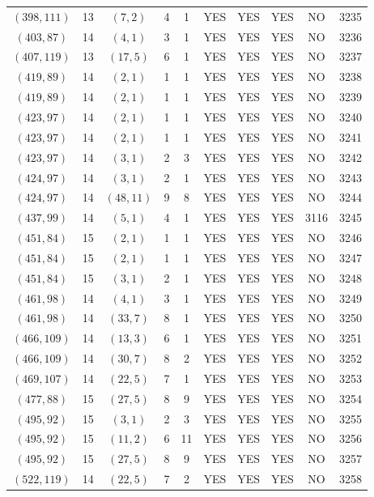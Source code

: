 \begin{longtable}{|c|c|c|c|c|c|c|c|c|c|}
$(398, 111)$ & 13 & $(7, 2)$ & 4 & 1 & YES & YES & YES & NO & 3235\\
$(403, 87)$ & 14 & $(4, 1)$ & 3 & 1 & YES & YES & YES & NO & 3236\\
$(407, 119)$ & 13 & $(17, 5)$ & 6 & 1 & YES & YES & YES & NO & 3237\\
$(419, 89)$ & 14 & $(2, 1)$ & 1 & 1 & YES & YES & YES & NO & 3238\\
$(419, 89)$ & 14 & $(2, 1)$ & 1 & 1 & YES & YES & YES & NO & 3239\\
$(423, 97)$ & 14 & $(2, 1)$ & 1 & 1 & YES & YES & YES & NO & 3240\\
$(423, 97)$ & 14 & $(2, 1)$ & 1 & 1 & YES & YES & YES & NO & 3241\\
$(423, 97)$ & 14 & $(3, 1)$ & 2 & 3 & YES & YES & YES & NO & 3242\\
$(424, 97)$ & 14 & $(3, 1)$ & 2 & 1 & YES & YES & YES & NO & 3243\\
$(424, 97)$ & 14 & $(48, 11)$ & 9 & 8 & YES & YES & YES & NO & 3244\\
$(437, 99)$ & 14 & $(5, 1)$ & 4 & 1 & YES & YES & YES & 3116 & 3245\\
$(451, 84)$ & 15 & $(2, 1)$ & 1 & 1 & YES & YES & YES & NO & 3246\\
$(451, 84)$ & 15 & $(2, 1)$ & 1 & 1 & YES & YES & YES & NO & 3247\\
$(451, 84)$ & 15 & $(3, 1)$ & 2 & 1 & YES & YES & YES & NO & 3248\\
$(461, 98)$ & 14 & $(4, 1)$ & 3 & 1 & YES & YES & YES & NO & 3249\\
$(461, 98)$ & 14 & $(33, 7)$ & 8 & 1 & YES & YES & YES & NO & 3250\\
$(466, 109)$ & 14 & $(13, 3)$ & 6 & 1 & YES & YES & YES & NO & 3251\\
$(466, 109)$ & 14 & $(30, 7)$ & 8 & 2 & YES & YES & YES & NO & 3252\\
$(469, 107)$ & 14 & $(22, 5)$ & 7 & 1 & YES & YES & YES & NO & 3253\\
$(477, 88)$ & 15 & $(27, 5)$ & 8 & 9 & YES & YES & YES & NO & 3254\\
$(495, 92)$ & 15 & $(3, 1)$ & 2 & 3 & YES & YES & YES & NO & 3255\\
$(495, 92)$ & 15 & $(11, 2)$ & 6 & 11 & YES & YES & YES & NO & 3256\\
$(495, 92)$ & 15 & $(27, 5)$ & 8 & 9 & YES & YES & YES & NO & 3257\\
$(522, 119)$ & 14 & $(22, 5)$ & 7 & 2 & YES & YES & YES & NO & 3258\\

\end{longtable}
